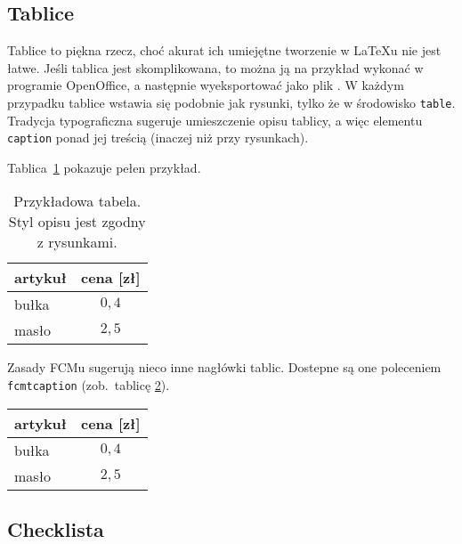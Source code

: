 \subsection{Tablice}

Tablice to piękna rzecz, choć akurat ich umiejętne tworzenie w \LaTeX{}u nie jest łatwe.
Jeśli tablica jest skomplikowana, to można ją na przykład wykonać w programie
OpenOffice, a następnie wyeksportować jako plik . W każdym przypadku tablice wstawia się podobnie
jak rysunki, tylko że w środowisko \texttt{table}. Tradycja typograficzna sugeruje umieszczenie opisu tablicy, a więc
elementu \texttt{caption} ponad jej treścią (inaczej niż przy rysunkach).

Tablica~\ref{tab:tabela} pokazuje pełen przykład.

\begin{table}[ht]
    \caption{Przykładowa tabela. Styl opisu jest zgodny z rysunkami.}\label{tab:tabela}
    \centering\footnotesize%
    \begin{tabular}{l c}
        \toprule
        artykuł & cena [zł] \\
        \midrule
        bułka   & $0,4$ \\
        masło   & $2,5$ \\
        \bottomrule
    \end{tabular}
\end{table}

Zasady FCMu sugerują nieco inne nagłówki tablic. Dostepne są one poleceniem \texttt{fcmtcaption} (zob.~tablicę
\ref{tab:tabela2}).

\begin{table}[ht]
    \label{tab:tabela2}
    \centering\footnotesize%
    \begin{tabular}{l c}
        \toprule
        artykuł & cena [zł] \\
        \midrule
        bułka   & $0,4$ \\
        masło   & $2,5$ \\
        \bottomrule
    \end{tabular}
\end{table}


\subsection{Checklista}


